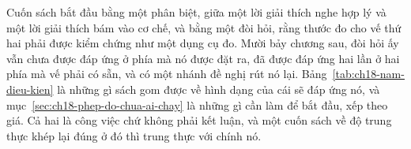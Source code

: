 %
Cuốn sách bắt đầu bằng một phân biệt, giữa một lời giải thích nghe hợp lý và một
lời giải thích bám vào cơ chế, và bằng một đòi hỏi, rằng thước đo cho vế thứ hai
phải được kiểm chứng như một dụng cụ đo. Mười bảy chương sau, đòi hỏi ấy vẫn
chưa được đáp ứng ở phía mà nó được đặt ra, đã được đáp ứng hai lần ở hai phía
mà vế phải có sẵn, và có một nhánh đề nghị rút nó lại. Bảng~\ref{tab:ch18-nam-dieu-kien}
là những gì sách gom được về hình dạng của cái sẽ đáp ứng nó, và
mục~\ref{sec:ch18-phep-do-chua-ai-chay} là những gì cần làm để bắt đầu, xếp theo
giá. Cả hai là công việc chứ không phải kết luận, và một cuốn sách về độ trung
thực khép lại đúng ở đó thì trung thực với chính nó.

